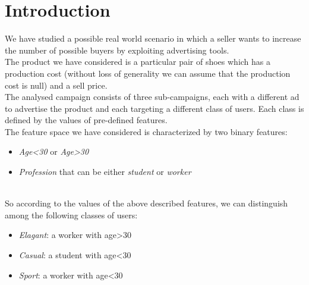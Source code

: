\section{Introduction}
We have studied a possible real world scenario in which a seller wants to increase the number of possible buyers by exploiting advertising tools.
\\
The product we have considered is a particular pair of shoes which has a production cost (without loss of generality we can assume that the production cost is null) and a sell price.
\\
The analysed campaign consists of three sub-campaigns, each with a different ad to advertise the product and each targeting a different class of users. Each class is defined by the values of pre-defined features.
\\
The feature space we have considered is characterized by two binary features: 
\begin{itemize}
\item \textit{Age<30} or \textit{Age>30}
\item \textit{Profession} that can be either \textit{student} or \textit{worker}
\end{itemize}
\\
So according to the values of the above described features, we can distinguish among the following classes of users:
\begin{itemize}
\item \textit{Elagant}: a worker with age>30
\item \textit{Casual}: a student with age<30
\item \textit{Sport}: a worker with age<30
\end{itemize}
\\